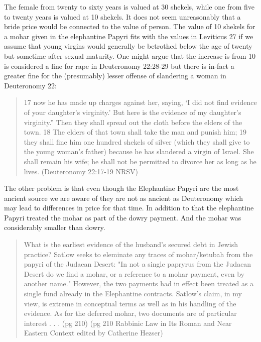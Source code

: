 \documentclass[11pt]{article}
\begin{document}
The female from twenty to sixty years is valued at 30 shekels, while one from five to twenty years is valued at 10 shekels. It does not seem unreasonably that a bride price would be connected to the value of person. The value of 10 shekels for a mohar given in the elephantine Papyri fits with the values in Leviticus 27 if we assume that young virgins would generally be betrothed below the age of twenty but sometime after sexual maturity. One might argue that the increase is from 10 is considered a fine for rape in Deuteronomy 22:28-29 but there is in-fact a greater fine for the (presumably) lesser offense of slandering a woman in Deuteronomy 22:
\begin{quote}
17 now he has made up charges against her, saying, ‘I did not find evidence of your daughter’s virginity.’ But here is the evidence of my daughter’s virginity.” Then they shall spread out the cloth before the elders of the town. 18 The elders of that town shall take the man and punish him; 19 they shall fine him one hundred shekels of silver (which they shall give to the young woman’s father) because he has slandered a virgin of Israel. She shall remain his wife; he shall not be permitted to divorce her as long as he lives.
(Deuteronomy 22:17-19 NRSV)
\end{quote}

The other problem is that even though the Elephantine Papyri are the most ancient source we are aware of they are not as ancient as Deuteronomy which may lead to differences in price for that time. In addition to that the elephantine Papyri treated the mohar as part of the dowry payment. And the mohar was considerably smaller than dowry. 


\begin{quote}
What is the earliest evidence of the husband's secured debt in Jewish practice? Satlow seeks to eleminate any traces of mohar/ketubah from the papyri of the Judaean Desert: "In not a single papryrus from the Judaean Desert do we find a mohar, or a reference to a mohar payment, even by another name." However, the two payments had in effect been treated as a single fund already in the Elephantine contracts. Satlow's claim, in my view, is extreme in conceptual terms as well as in his handling of the evidence. As for the deferred mohar, two documents are of particular interest . . . (pg 210)
(pg 210 Rabbinic Law in Its Roman and Near Eastern Context
edited by Catherine Hezser)
\end{quote}
\end{document}
